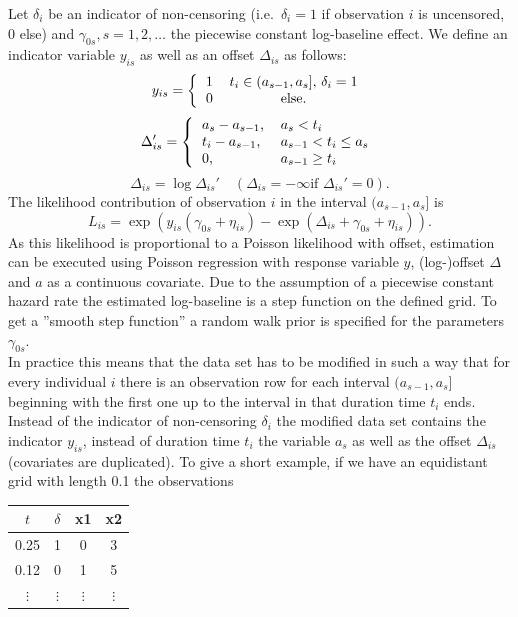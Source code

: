\documentclass[11pt,a4paper,twoside]{bayesxarticle}
\begin{document}
Let $\delta_i$ be an indicator of non-censoring (i.e.~$\delta_i=1$
if observation $i$ is uncensored, 0 else) and
$\gamma_{0s},s=1,2,\ldots$ the piecewise constant log-baseline
effect. We define an indicator variable $y_{is}$ as well as an
offset $\Delta_{is}$ as follows:
\[
y_{is}=\left\{
 \begin{tabular}{cc}
1 & $t_i\in (a_{s-1},a_s]$, $\delta_i=1$\\0 & else.
 \end{tabular}
 \right.
\]
\vspace{0.05cm}
\[
\Delta_{is}'=\left\{\begin{tabular}{ll} $a_s-a_{s-1}$,&$a_s<t_i$ \\ $t_i-a_{s-1}$,&$a_{s-1}<t_i\le a_s$ \\
0, &$a_{s-1}\ge t_i$
\end{tabular}\right.
\]
\[
\Delta_{is}=\log{\Delta_{is}'} \quad (\Delta_{is}=-\infty \textrm{
if } \Delta_{is}'=0).
\]
The likelihood contribution of observation $i$ in the interval
$(a_{s-1},a_s]$ is
\[
L_{is}=\exp\left(y_{is}(\gamma_{0s}+\eta_{is})-\exp(\Delta_{is}+\gamma_{0s}+\eta_{is})\right).
\]
As this likelihood is proportional to a Poisson likelihood with
offset, estimation can be executed using Poisson regression with
response variable $y$, (log-)offset $\Delta$ and $a$ as a
continuous covariate. Due to the assumption of a piecewise
constant hazard rate the estimated log-baseline is a step function
on the defined grid. To get a ''smooth step function'' a random
walk prior is specified
for the parameters $\gamma_{0s}$.\\
In practice this means that the data set has to be modified in
such a way that for every individual $i$ there is an observation
row for each interval $(a_{s-1},a_s]$ beginning with the first one
up to the interval in that duration time $t_i$ ends. Instead of
the indicator of non-censoring $\delta_i$ the modified data set
contains the indicator $y_{is}$, instead of duration time $t_i$
the variable $a_s$ as well as the offset $\Delta_{is}$ (covariates
are duplicated). To give a short example, if we have an
equidistant grid with length 0.1 the observations
\vspace{0.5cm}\\
\begin{tabular}{c|c|c|c}
  $t$ &   $\delta$ &  x1 &  x2\\\hline\hline
0.25  &  1  &    0  &  3\\\hline 0.12  &  0  &    1  &  5\\\hline
$\vdots$ & $\vdots$ & $\vdots$ & $\vdots$ \\
\end{tabular}
\end{document}
